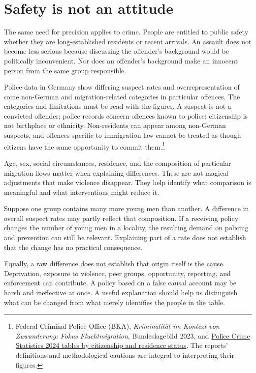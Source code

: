 \documentclass[12pt,a4paper]{book}
\begin{document}
\section*{Safety is not an attitude}

The same need for precision applies to crime. People are entitled to public safety whether they are long-established residents or recent arrivals. An assault does not become less serious because discussing the offender's background would be politically inconvenient. Nor does an offender's background make an innocent person from the same group responsible.

Police data in Germany show differing suspect rates and overrepresentation of some non-German and migration-related categories in particular offences. The categories and limitations must be read with the figures. A suspect is not a convicted offender; police records concern offences known to police; citizenship is not birthplace or ethnicity. Non-residents can appear among non-German suspects, and offences specific to immigration law cannot be treated as though citizens have the same opportunity to commit them.\footnote{Federal Criminal Police Office (BKA), \emph{Kriminalität im Kontext von Zuwanderung: Fokus Fluchtmigration}, Bundeslagebild 2023, and \href{https://www.bka.de/DE/AktuelleInformationen/StatistikenLagebilder/PolizeilicheKriminalstatistik/PKS2024/PKSTabellen/BundTVNationalitaet/bundTVNationalitaet.html}{Police Crime Statistics 2024 tables by citizenship and residence status}. The reports' definitions and methodological cautions are integral to interpreting their figures.}

Age, sex, social circumstances, residence, and the composition of particular migration flows matter when explaining differences. These are not magical adjustments that make violence disappear. They help identify what comparison is meaningful and what interventions might reduce it.

Suppose one group contains many more young men than another. A difference in overall suspect rates may partly reflect that composition. If a receiving policy changes the number of young men in a locality, the resulting demand on policing and prevention can still be relevant. Explaining part of a rate does not establish that the change has no practical consequence.

Equally, a raw difference does not establish that origin itself is the cause. Deprivation, exposure to violence, peer groups, opportunity, reporting, and enforcement can contribute. A policy based on a false causal account may be harsh and ineffective at once. A useful explanation should help us distinguish what can be changed from what merely identifies the people in the table.
\end{document}
